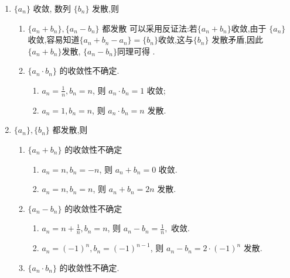 \begin{solution}
    \begin{enumerate}
        \item $\{a_n\}$ 收敛, 数列 $\{b_n\}$ 发散,则
              \begin{enumerate}
                  \item  $\{a_n + b_n\}, \{a_n - b_n\}$ 都发散
                        可以采用反证法:若$\{a_n + b_n\}$收敛,由于 $\{a_n\}$ 收敛,容易知道$\{a_n + b_n-a_n\}=\{b_n\}$收敛,这与$\{b_n\}$ 发散矛盾,因此$\{a_n + b_n\}$发散, $\{a_n - b_n\}$同理可得 .
                  \item $\{a_n \cdot b_n\}$ 的收敛性不确定.
                        \begin{enumerate}
                            \item  $a_n = \frac{1}{n}, b_n = n$, 则 $a_n \cdot b_n = 1$ 收敛;
                            \item  $a_n = 1, b_n = n$, 则 $a_n \cdot b_n = n$ 发散.
                        \end{enumerate}
              \end{enumerate}
        \item  $\{a_n\}, \{b_n\}$ 都发散,则
              \begin{enumerate}
                  \item  $\{a_n + b_n\}$ 的收敛性不确定
                        \begin{enumerate}
                            \item  $a_n = n, b_n =-n$, 则 $a_n + b_n = 0$ 收敛.
                            \item  $a_n = n, b_n = n$, 则 $a_n + b_n = 2n$ 发散.
                        \end{enumerate}
                  \item  $\{a_n - b_n\}$ 的收敛性不确定
                        \begin{enumerate}
                            \item  $a_n = n+\frac{1}{n}, b_n = n$, 则 $a_n - b_n = \frac{1}{n},$ 收敛.
                            \item  $a_n = (-1)^{n}, b_n =(-1)^{n-1}$, 则 $a_n -b_n = 2\cdot(-1)^{n}$ 发散.
                        \end{enumerate}
                  \item $\{a_n \cdot b_n\}$ 的收敛性不确定.
\end{enumerate}
\end{enumerate}
\end{solution}
